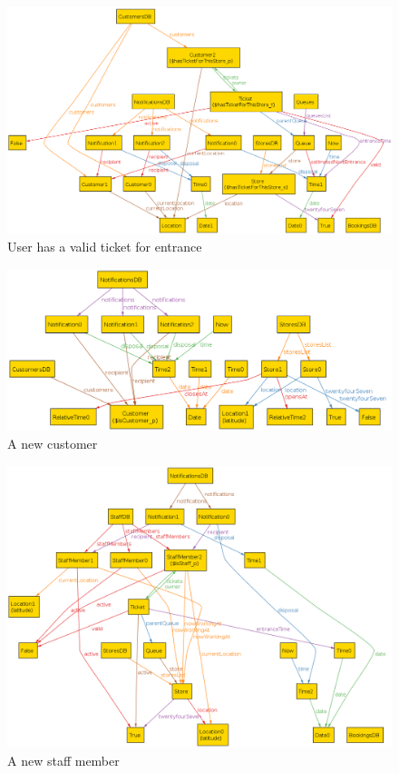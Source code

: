 \begin{figure} [H]
	\includegraphics[width=\linewidth]{../Alloy/hasTicketForThisStore.png}
	\caption{User has a valid ticket for entrance}
	\label{fig:hasTicketForThisStore}
\end{figure}

\begin{figure} [H]
	\includegraphics[width=\linewidth]{../Alloy/isCustomer.png}
	\caption{A new customer}
	\label{fig:alloyIsCustomer}
\end{figure}

\begin{figure} [H]
	\includegraphics[width=\linewidth]{../Alloy/isStaff.png}
	\caption{A new staff member}
	\label{fig:alloyIsStaff}
\end{figure}

